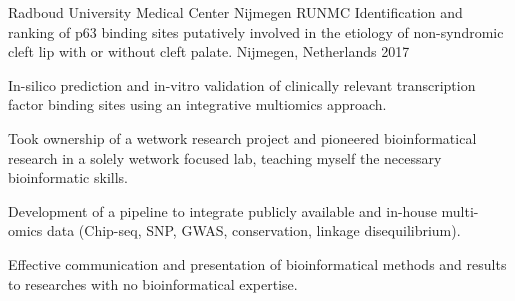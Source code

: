 

\begin{cventries}

  \cventry
    {Radboud University Medical Center Nijmegen RUNMC} %
    {Identification and ranking of p63 binding sites putatively
    involved in the etiology of non-syndromic cleft lip with or
    without cleft palate.} %
    {Nijmegen, Netherlands} %
    {2017} %
    { 
      \begin{cvitems} %
        \item {In-silico prediction and in-vitro validation of clinically relevant transcription factor binding sites using an integrative multiomics approach.}
        \item {Took ownership of a wetwork research project and pioneered bioinformatical research in a solely wetwork focused lab, teaching myself the necessary bioinformatic skills.}
        \item {Development of a pipeline to integrate publicly available and in-house multi-omics data (Chip-seq, SNP, GWAS, conservation, linkage disequilibrium).}
        \item {Effective communication and presentation of bioinformatical methods and results to researches with no bioinformatical expertise.}
      \end{cvitems}
    }


\end{cventries}

